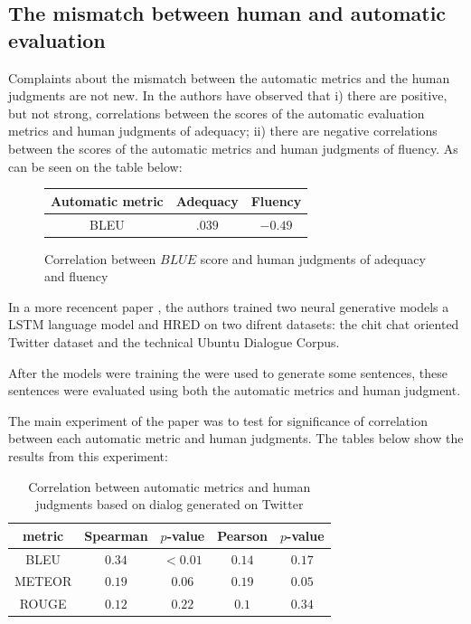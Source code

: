 \subsection{The mismatch between human and automatic evaluation}

Complaints about the mismatch between the automatic metrics and the human judgments are not new. In  \cite{Stent} the authors have observed that i) there  are  positive,  but  not  strong,  correlations  between  the  scores  of the automatic evaluation metrics and human judgments of adequacy; ii) there are negative correlations between the scores of the automatic metrics and human judgments of fluency. As can be seen on the table below:

\begin{figure}[h]
\label{stenttable}
\begin{center}
\begin{tabular}{|c|c|c|}
\hline
\cellcolor{blue!10} Automatic metric & \cellcolor{blue!10} Adequacy & \cellcolor{blue!10} Fluency \\ \hline
BLEU & $.039$ & $-0.49$ \\ \hline
\end{tabular}
\end{center}
\caption{Correlation between $BLUE$ score and human judgments of adequacy and fluency \cite{Stent}}
\end{figure}


In a more recencent paper  \cite{LiuLSNCP16}, the authors trained two neural generative models a LSTM language model and HRED on two difrent datasets: the chit chat oriented Twitter dataset and the technical Ubuntu Dialogue Corpus.

After the models were training the were used to generate some sentences, these sentences were evaluated using both the automatic metrics and human judgment. 



The main experiment of the paper was to test for significance of correlation between each automatic metric and  human judgments. The tables below show the results from this experiment:


\begin{table}[h]
\centering
\label{hownottable}
\begin{tabular}{|c|c|c|c|c|}
\hline
\cellcolor{blue!10} metric & \cellcolor{blue!10} Spearman & \cellcolor{blue!10} $p$-value & \cellcolor{blue!10} Pearson &  \cellcolor{blue!10} $p$-value \\ \hline
BLEU   & $0.34$   & $< 0.01$  & $0.14$  & $0.17$ \\ \hline
METEOR & $0.19$   & $0.06$    & $0.19$  & $0.05$ \\ \hline
ROUGE  & $0.12$   & $0.22$    & $0.1$   & $0.34$ \\ \hline  
\end{tabular}
\caption{Correlation between automatic metrics and human judgments based on dialog generated on Twitter \cite{LiuLSNCP16}}
\end{table}


